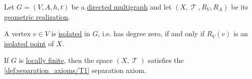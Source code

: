 \begin{proposition}\label{thm:def:graph_geometric_realization}
  Let \( G = (V, A, h, t) \) be a \hyperref[def:directed_multigraph]{directed multigraph} and let \( (X, \mscrT, R_V, R_A) \) be its \hyperref[def:graph_geometric_realization]{geometric realization}.

  \begin{thmenum}
     A vertex \( v \in V \) is \hyperref[def:isolated_vertex]{isolated} in \( G \), i.e. has degree zero, if and only if \( R_V(v) \) is an \hyperref[def:cluster_point]{isolated point} of \( X \).

     If \( G \) is \hyperref[def:graph_cardinality/local]{locally finite}, then the space \( (X, \mscrT) \) satisfies the \ref{def:separation_axioms/T1} separation axiom.
  \end{thmenum}
\end{proposition}
